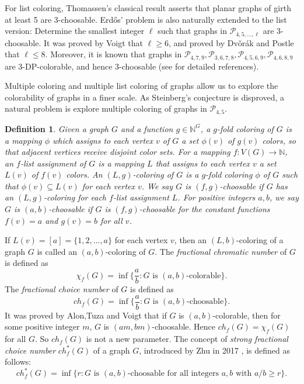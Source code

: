 \documentclass{article}
\newtheorem{definition}{Definition}
\begin{document}
For list coloring, Thomassen's classical result asserts that planar graphs of girth at least 5 are 3-choosable.  Erd\H{o}s' problem is also naturally extended to the list version: Determine the smallest integer $\ell$ such that graphs in $\mathcal{P}_{4,5,\ldots, \ell}$  are 3-choosable. It was proved by Voigt \cite{Voigt2007}  that $\ell \ge 6$, and proved by Dv\v{o}r\'{a}k and Postle \cite{dvovrak2018correspondence} that $\ell \le 8$. Moreover, it is known   that  graphs in $\mathcal{P}_{4,7,9},\mathcal{P}_{3,6,7,8},\mathcal{P}_{4,5,6,9},\mathcal{P}_{4,6,8,9}$  are 3-DP-colorable, and hence $3$-choosable  (see \cite{KangJinZhu} for detailed references).  

Multiple coloring and multiple list coloring of graphs allow us to explore the colorability of graphs in a finer scale.  As Steinberg's conjecture is disproved, a natural problem is explore multiple coloring of graphs in $\mathcal{P}_{4,5}$.   

    \begin{definition}
      Given a graph $G$ and a function $g \in \mathbb{N}^G$, a \textit{$g$-fold coloring} of $G$ is a mapping $\phi$ which assigns to each vertex $v$ of $G$ a set $\phi(v)$ of $g(v)$ colors, so that adjacent vertices receive disjoint color sets. For a mapping $f: V(G) \to \mathbb{N}$, an $f$-list assignment of $G$ is a mapping $L$ that assigns to each vertex $v$ a set $L(v)$ of $f(v)$ colors. An $(L,g)$-coloring of $G$ is a $g$-fold coloring $\phi$ of $G$ such that $\phi(v) \subseteq L(v)$ for each vertex $v$. We say $G$ is $(f, g)$-choosable if $G$ has an $(L,g)$-coloring for each $f$-list assignment $L$. For positive integers $a,b$, we say $G$ is $(a,b)$-choosable if $G$ is $(f,g)$-choosable for the constant functions $f(v)=a$ and $g(v)=b$ for all $v$. 
    \end{definition}

  If $L(v)=[a]=\{1,2,\ldots, a\}$ for each vertex $v$, then an $(L,b)$-coloring of a graph $G$ is called an $(a,b)$-coloring  of $G$. The \textit{  fractional chromatic number} of $G$ is defined as $$\chi_f(G) = \inf \{ \frac ab: G \text{ is $(a,b)$-colorable}\}.$$ 
 The \textit{fractional choice number} of $G$ is defined as 
 $$ch_f(G) = \inf\{ \frac ab: G \text{ is $(a,b)$-choosable}\}.$$ 
 It was proved by Alon,Tuza and Voigt \cite{AlonTuzaVoigt} that if $G$ is $(a,b)$-colorable, then for some positive integer $m$, $G$ is $(am,bm)$-choosable. Hence $ch_f(G)=\chi_f(G)$ for all $G$. So $ch_f(G)$ is not a new parameter. The concept of \textit{strong fractional choice number} $ch_f^*(G)$ of a graph $G$, introduced by Zhu in 2017 \cite{ZhuStrongfractionalchoicenumber}, is defined as follows:
 $$ch_f^*(G) = \inf\{r: G \text{ is $(a,b)$-choosable for all integers $a, b$ with $a/b \ge r$}\}.  $$
\end{document}
